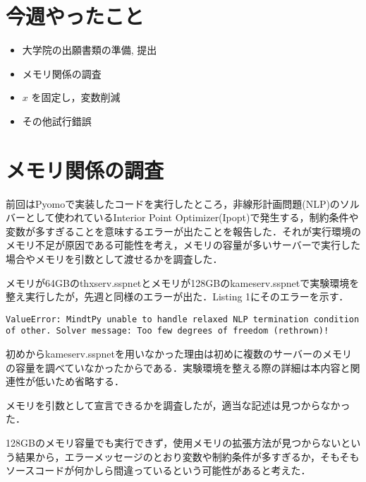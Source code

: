 \documentclass[twocolumn]{jarticle}
\begin{document}


\section{今週やったこと}
	\begin{itemize}
		\item 大学院の出願書類の準備, 提出
        \item メモリ関係の調査
        \item $x$ を固定し，変数削減
        \item その他試行錯誤
	\end{itemize}

\section{メモリ関係の調査}
    前回はPyomoで実装したコードを実行したところ，非線形計画問題(NLP)のソルバーとして使われているInterior Point Optimizer(Ipopt)で発生する，制約条件や変数が多すぎることを意味するエラーが出たことを報告した．それが実行環境のメモリ不足が原因である可能性を考え，メモリの容量が多いサーバーで実行した場合やメモリを引数として渡せるかを調査した．

    メモリが64GBのthxserv.sspnetとメモリが128GBのkameserv.sspnetで実験環境を整え実行したが，先週と同様のエラーが出た．Listing 1にそのエラーを示す．
    \begin{lstlisting}[caption = 発生したエラー]
        ValueError: MindtPy unable to handle relaxed NLP termination condition of other. Solver message: Too few degrees of freedom (rethrown)!
    \end{lstlisting}
    初めからkameserv.sspnetを用いなかった理由は初めに複数のサーバーのメモリの容量を調べていなかったからである．実験環境を整える際の詳細は本内容と関連性が低いため省略する．

    メモリを引数として宣言できるかを調査したが，適当な記述は見つからなかった．
    
    128GBのメモリ容量でも実行できず，使用メモリの拡張方法が見つからないという結果から，エラーメッセージのとおり変数や制約条件が多すぎるか，そもそもソースコードが何かしら間違っているという可能性があると考えた．
\end{document}
